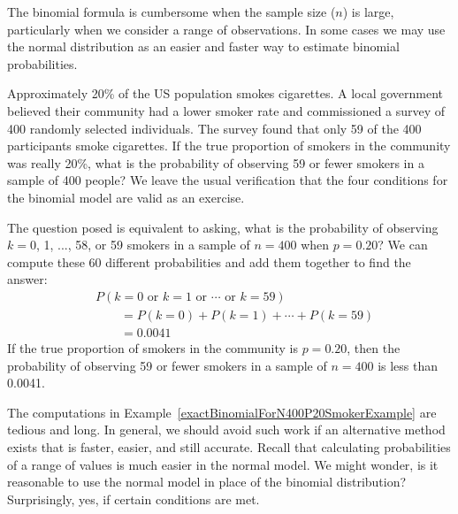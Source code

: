 
The binomial formula is cumbersome when the sample size ($n$) is large, particularly when we consider a range of observations. In some cases we may use the normal distribution as an easier and faster way to estimate binomial probabilities.


\begin{examplewrap}
\begin{nexample}{Approximately 20\% of the US population smokes cigarettes. A local government believed their community had a lower smoker rate and commissioned a survey of 400 randomly selected individuals. The survey found that only 59 of the 400 participants smoke cigarettes. If the true proportion of smokers in the community was really 20\%, what is the probability of observing 59 or fewer smokers in a sample of 400 people?}\label{exactBinomialForN400P20SmokerExample}
We leave the usual verification that the four conditions for the binomial model are valid as an exercise.

The question posed is equivalent to asking, what is the probability of observing $k=0$, 1, ..., 58, or 59 smokers in a sample of $n=400$ when $p=0.20$? We can compute these 60 different probabilities and add them together to find the answer:
\begin{align*}
&P(k=0\text{ or }k=1\text{ or }\cdots\text{ or } k=59) \\
	&\qquad= P(k=0) + P(k=1) + \cdots + P(k=59) \\
	&\qquad=0.0041
\end{align*}
If the true proportion of smokers in the community is $p=0.20$, then the probability of observing 59 or fewer smokers in a sample of $n=400$ is less than 0.0041.
\end{nexample}
\end{examplewrap}

The computations in Example~\ref{exactBinomialForN400P20SmokerExample} are tedious and long. In general, we should avoid such work if an alternative method exists that is faster, easier, and still accurate. Recall that calculating probabilities of a range of values is much easier in the normal model. We might wonder, is it reasonable to use the normal model in place of the binomial distribution? Surprisingly, yes, if certain conditions are met.

